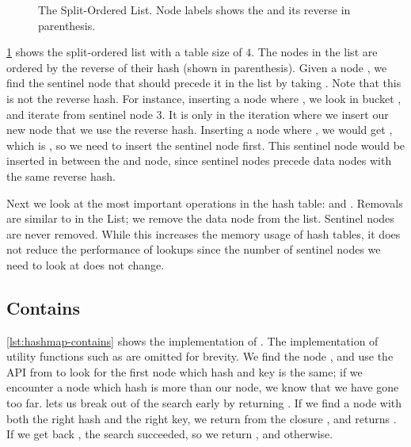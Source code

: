 \begin{figure}[ht]
\centering

\caption{The Split-Ordered List. Node labels shows the  and its reverse in
parenthesis.\label{fig:split-order-list}}
\end{figure}

\cref{fig:split-order-list} shows the split-ordered list with a table size of $4$. The nodes in the
list are ordered by the reverse of their hash (shown in parenthesis). Given a node , we
find the sentinel node that should precede it in the list by taking .
Note that this is not the reverse hash. For instance, inserting a node where ,
we look in bucket , and iterate from sentinel node 3. It is only in the iteration
where we insert our new node that we use the reverse hash.  Inserting a node where , we would get , which is , so we need to insert the sentinel node
first. This sentinel node would be inserted in between the  and  node, since
sentinel nodes precede data nodes with the same reverse hash.

Next we look at the most important operations in the hash table:  and .
Removals are similar to in the List; we remove the data node from the list. Sentinel nodes are
never removed. While this increases the memory usage of hash tables, it does not reduce the
performance of lookups since the number of sentinel nodes we need to look at does not change.

\subsection{Contains}

\cref{lst:hashmap-contains} shows the implementation of . The
implementation of utility functions such as  are omitted for brevity.  We
find the  node , and use the  API from 
 to look for the first node which hash and key is the same; if we encounter a node
which hash is more than our node, we know that we have gone too far. 
lets us break out of the search early by returning  . If we find a node
with both the right hash and the right key, we return  from the
closure , and  returns . If we get back , the
search succeeded, so we return , and  otherwise.



